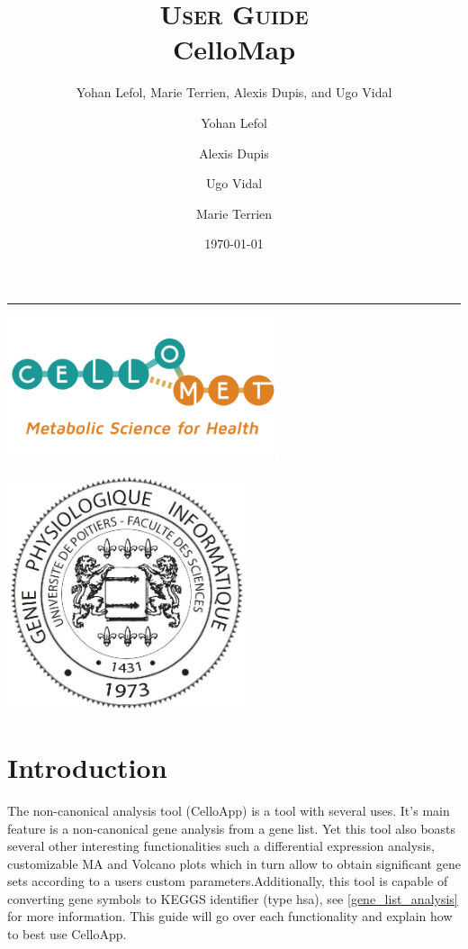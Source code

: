 \documentclass[11pt]{article}
\author{Yohan Lefol, Marie Terrien, Alexis Dupis, and Ugo Vidal}
\title{
\textsc{User Guide}\\[2.6cm]
{\LARGE \bfseries CelloMap}
}
\author{
Yohan Lefol
\and 
Alexis Dupis
\and
Ugo Vidal
\and
Marie Terrien
}
\date{
\today
}
\begin{document}
\maketitle
\hrule
\begin{center}
\includegraphics[width = 8cm]{logo-CELLOMET-a.png}
\end{center}

\begin{center}
\includegraphics[width = 7cm]{Logo-Master-GPhy.png}
\end{center}
\newpage
\section{Introduction \label{intro}}
The non-canonical analysis tool (CelloApp) is a tool with several uses. It's main feature is a non-canonical gene analysis from a gene list. Yet this tool also boasts several other interesting functionalities such a differential expression analysis, customizable MA and Volcano plots which in turn allow to obtain significant gene sets according to a users custom parameters.Additionally, this tool is capable of converting gene symbols to KEGGS identifier (type hsa), see \autoref{gene_list_analysis} for more information.
This guide will go over each functionality and explain how to best use CelloApp.
\end{document}

